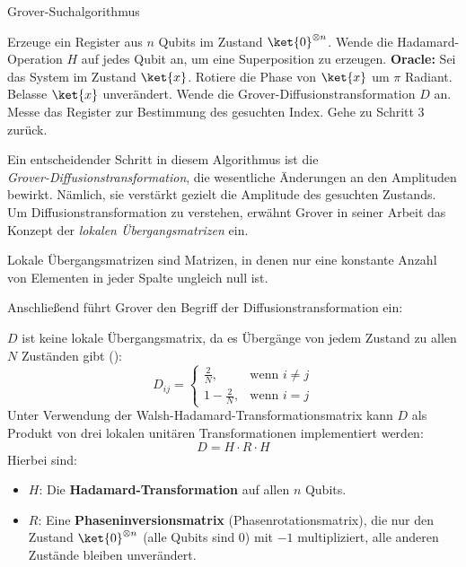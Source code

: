 {\begin{algorithm}[H]
\label{alg:grover}
\caption{Grover-Suchalgorithmus}
\begin{algorithmic}[1]
\State Erzeuge ein Register aus \( n \) Qubits im Zustand \( \ket{0}^{\otimes n} \).
\State Wende die Hadamard-Operation \( H \) auf jedes Qubit an, um eine Superposition zu erzeugen.
\Repeat
  \State\textbf{Oracle:}
  \Statex \hspace{1em} Sei das System im Zustand \( \ket{x} \).
    \State Rotiere die Phase von \( \ket{x} \) um \( \pi \) Radiant.
  \Else
    \State Belasse \( \ket{x} \) unverändert.
  \EndIf
  \State Wende die Grover-Diffusionstransformation $D$ an.
  \State Messe das Register zur Bestimmung des gesuchten Index.
  \State Gehe zu Schritt 3 zurück.
\EndIf
{}
\end{algorithmic}
\end{algorithm}

Ein entscheidender Schritt in diesem Algorithmus ist die\\ \textit{Grover-Diffusionstransformation}, die wesentliche Änderungen an den Amplituden bewirkt. Nämlich, sie verstärkt gezielt die Amplitude des gesuchten Zustands. Um Diffusionstransformation zu verstehen, erwähnt Grover in seiner Arbeit das Konzept der \textit{lokalen Übergangsmatrizen} ein.

\begin{definition}
Lokale Übergangsmatrizen sind Matrizen, in denen nur eine konstante Anzahl von Elementen in jeder Spalte ungleich null ist.
\end{definition}

Anschließend führt Grover den Begriff der Diffusionstransformation ein:

\begin{definition}
\( D \) ist keine lokale Übergangsmat\-rix, da es Übergänge von jedem Zustand zu allen \( N \) Zuständen gibt (\cite{zotero-1211}):
$$
D_{ij} = 
\begin{cases}
\frac{2}{N}, & \text{wenn } i \ne j \\
1 - \frac{2}{N}, & \text{wenn } i = j
\end{cases}
$$
Unter Verwendung der Walsh-Hadamard-Transformationsmatrix kann \( D \) als Produkt von drei lokalen unitären Transformationen implementiert werden:
$$
D = H \cdot R \cdot H
$$
Hierbei sind:
\begin{itemize}
\item $H$: Die \textbf{Hadamard-Transformation} auf allen $n$ Qubits.
\item $R$: Eine \textbf{Phaseninversionsmatrix} (Phasenrotationsmatrix), die nur den Zustand $\ket{0}^{\otimes n}$ (alle Qubits sind 0) mit $-1$ multipliziert, alle anderen Zustände bleiben unverändert.
\end{itemize}
\end{definition}

}
